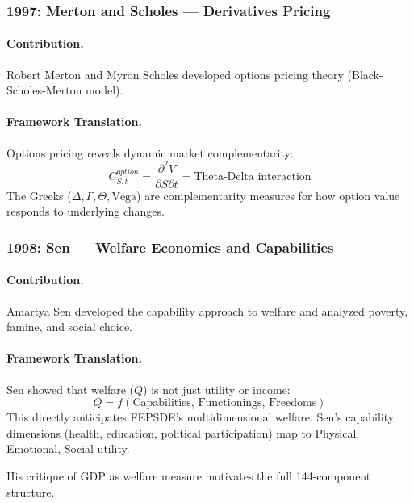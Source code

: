 \subsubsection{1997: Merton and Scholes --- Derivatives Pricing}

\paragraph{Contribution.}
Robert Merton and Myron Scholes developed options pricing theory
(Black-Scholes-Merton model).

\paragraph{Framework Translation.}
Options pricing reveals dynamic market complementarity:
\begin{equation}
  C^{option}_{S,t} = \frac{\partial^2 V}{\partial S \partial t} = \text{Theta-Delta interaction}
\end{equation}
The Greeks ($\Delta, \Gamma, \Theta, \text{Vega}$) are complementarity measures
for how option value responds to underlying changes.

\subsubsection{1998: Sen --- Welfare Economics and Capabilities}

\paragraph{Contribution.}
Amartya Sen \citep{sen1999} developed the capability approach to welfare and
analyzed poverty, famine, and social choice.

\paragraph{Framework Translation.}
Sen showed that welfare ($Q$) is not just utility or income:
\begin{equation}
  Q = f(\text{Capabilities, Functionings, Freedoms})
\end{equation}
This directly anticipates FEPSDE's multidimensional welfare.
Sen's capability dimensions (health, education, political participation)
map to Physical, Emotional, Social utility.

His critique of GDP as welfare measure motivates the full 144-component structure.

